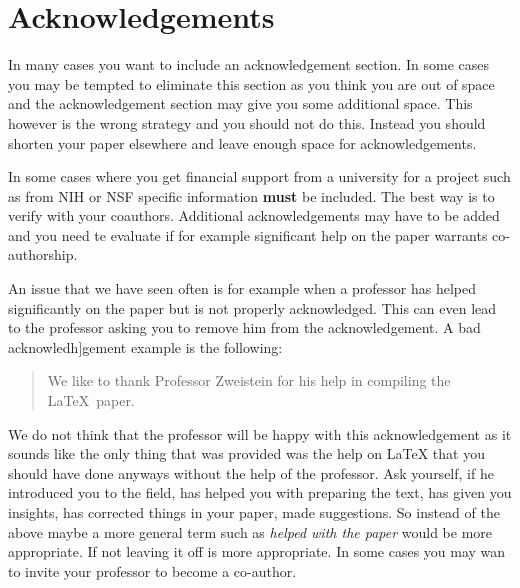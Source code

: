 \FILENAME

\section{Acknowledgements}
\label{S:acknowledgements}

In many cases you want to include an acknowledgement section. In some cases you may be tempted to eliminate this section as you think you are out of space and the acknowledgement section may give you some additional space. This however is the wrong strategy and you should not do this. Instead you should shorten your paper elsewhere and leave enough space for acknowledgements.

In some cases where you get financial support from a university for a project such as from NIH or NSF specific information {\bf must} be included. The best way is to verify with your coauthors. Additional acknowledgements may have to be added and you need te evaluate if for example significant help on the paper warrants co-authorship.

An issue that we have seen often is for example when a professor has helped significantly on the paper but is not properly acknowledged. This can even lead to the professor asking you to remove him from the acknowledgement. A bad acknowledh]gement example is the following:

\begin{quote}
We like to thank Professor Zweistein for his help in compiling  the \LaTeX~paper.
\end{quote}

We do not think that the professor will be happy with this acknowledgement as it sounds like the only thing that was provided was the help on LaTeX that you should have done anyways without the help of the professor. Ask yourself, if he introduced you to the field, has helped you with preparing the text, has given you insights, has corrected things in your paper, made suggestions. So instead of the above maybe a more general term such as \textit{helped with the paper} would be more appropriate. If not leaving it off is more appropriate. In some cases you may wan to invite your professor to become a co-author.